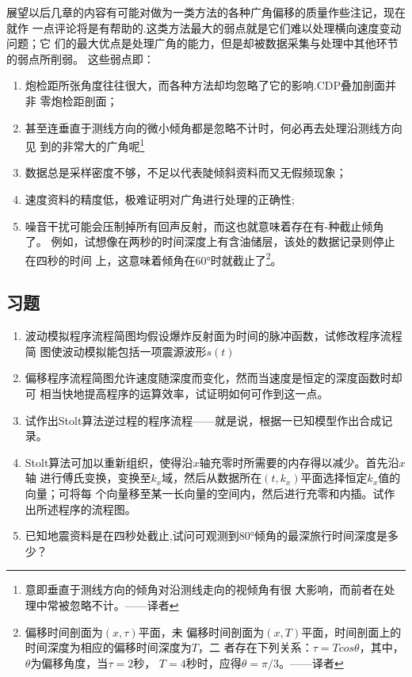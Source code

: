 展望以后几章的内容有可能对做为一类方法的各种广角偏移的质量作些注记，现在就作
一点评论将是有帮助的.这类方法最大的弱点就是它们难以处理横向速度变动问题；它
们的最大优点是处理广角的能力，但是却被数据采集与处理中其他环节的弱点所削弱。
这些弱点即：
\begin{enumerate}
\item   炮检距所张角度往往很大，而各种方法却均忽略了它的影响.CDP叠加剖面并非
  零炮检距剖面；
\item 甚至连垂直于测线方向的微小倾角都是忽略不计时，何必再去处理沿测线方向见
到的非常大的广角呢\footnote{意即垂直于测线方向的倾角对沿测线走向的视倾角有很
大影响，而前者在处理中常被忽略不计。——译者}
\item 数据总是采样密度不够，不足以代表陡倾斜资料而又无假频现象；
\item 速度资料的精度低，极难证明对广角进行处理的正确性;
\item 噪音干扰可能会压制掉所有回声反射，而这也就意味着存在有-种截止倾角了。
例如，试想像在两秒的时间深度上有含油储层，该处的数据记录则停止在四秒的时间
上，这意味着倾角在60°时就截止了\footnote{偏移时间剖面为$(x,\tau)$平面，未
偏移时间剖面为$(x,T)$平面，时间剖面上的时间深度为相应的偏移时间深度为$T$，二
者存在下列关系：$\tau=Tcos\theta$，其中，$\theta$为偏移角度，当$\tau=2$秒，
$T=4$秒时，应得$\theta=\pi/3$。——译者}。
\end{enumerate}
\subsection{习题}
\begin{enumerate}
\item 波动模拟程序流程简图均假设爆炸反射面为时间的脉冲函数，试修改程序流程简
图使波动模拟能包括一项震源波形$s(t)$
\item 偏移程序流程简图允许速度随深度而变化，然而当速度是恒定的深度函数时却可
相当快地提高程序的运算效率，试证明如何可作到这一点。
\item 试作出Stolt算法逆过程的程序流程——就是说，根据一已知模型作出合成记录。
\item Stolt算法可加以重新组织，使得沿$x$轴充零时所需要的内存得以减少。首先沿$x$轴
  进行傅氏变换，变换至$k_x$域，然后从数据所在$(t,k_x)$平面选择恒定$k_x$值的向量；可将每
  个向量移至某一长向量的空间内，然后进行充零和内插。试作出所述程序的流程图。
\item 已知地震资料是在四秒处截止,试问可观测到80°倾角的最深旅行时间深度是多少？
\end{enumerate}
